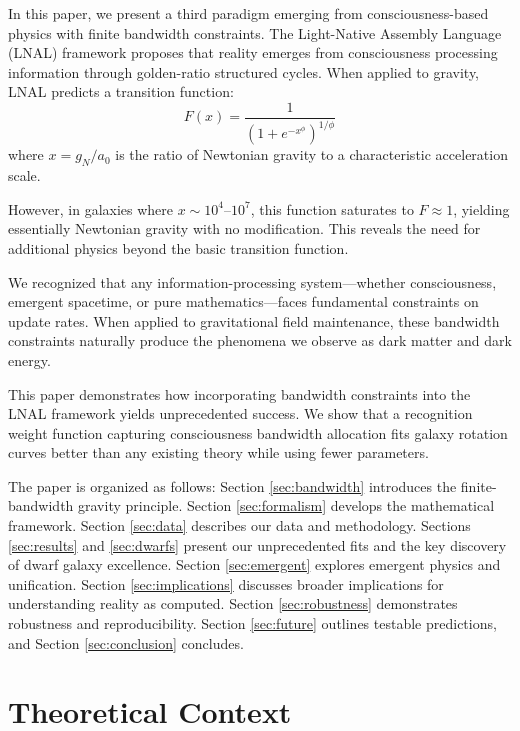 \documentclass[twocolumn,prd,amsmath,amssymb,aps,superscriptaddress,nofootinbib]{revtex4-2}
\newcommand{\azero}{a_0}
\begin{document}
In this paper, we present a third paradigm emerging from consciousness-based physics with finite bandwidth constraints. The Light-Native Assembly Language (LNAL) framework \cite{Washburn2024} proposes that reality emerges from consciousness processing information through golden-ratio structured cycles. When applied to gravity, LNAL predicts a transition function:
\begin{equation}
F(x) = \frac{1}{(1 + e^{-x^\phi})^{1/\phi}}
\end{equation}
where $x = g_N/\azero$ is the ratio of Newtonian gravity to a characteristic acceleration scale.

However, in galaxies where $x \sim 10^4$--$10^7$, this function saturates to $F \approx 1$, yielding essentially Newtonian gravity with no modification. This reveals the need for additional physics beyond the basic transition function.

We recognized that any information-processing system---whether consciousness, emergent spacetime, or pure mathematics---faces fundamental constraints on update rates. When applied to gravitational field maintenance, these bandwidth constraints naturally produce the phenomena we observe as dark matter and dark energy.

This paper demonstrates how incorporating bandwidth constraints into the LNAL framework yields unprecedented success. We show that a recognition weight function capturing consciousness bandwidth allocation fits galaxy rotation curves better than any existing theory while using fewer parameters.

The paper is organized as follows: Section \ref{sec:bandwidth} introduces the finite-bandwidth gravity principle. Section \ref{sec:formalism} develops the mathematical framework. Section \ref{sec:data} describes our data and methodology. Sections \ref{sec:results} and \ref{sec:dwarfs} present our unprecedented fits and the key discovery of dwarf galaxy excellence. Section \ref{sec:emergent} explores emergent physics and unification. Section \ref{sec:implications} discusses broader implications for understanding reality as computed. Section \ref{sec:robustness} demonstrates robustness and reproducibility. Section \ref{sec:future} outlines testable predictions, and Section \ref{sec:conclusion} concludes.

\section{Theoretical Context}
\label{sec:context}
\end{document}
